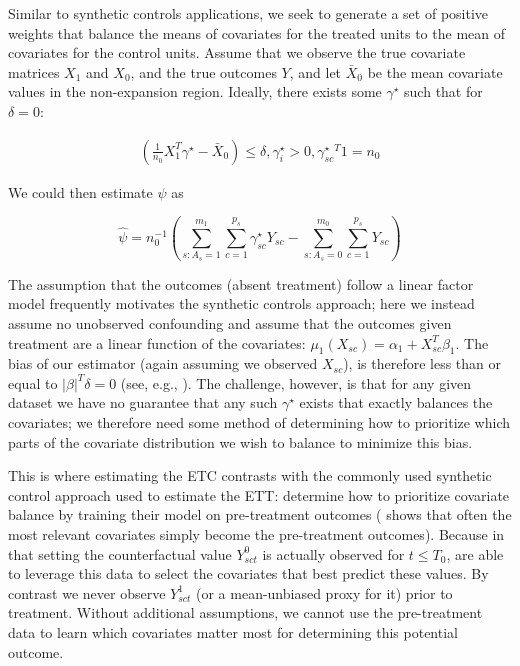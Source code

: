 \documentclass[aoas]{imsart}
\theoremstyle{plain}
\theoremstyle{remark}
\begin{document}
Similar to synthetic controls applications, we seek to generate a set of positive weights that balance the means of covariates for the treated units to the mean of covariates for the control units. Assume that we observe the true covariate matrices $X_1$ and $X_0$, and the true outcomes $Y$, and let $\bar{X}_0$ be the mean covariate values in the non-expansion region. Ideally, there exists some $\gamma^\star$ such that for $\delta = 0$: 

\begin{align*}
(\frac{1}{n_0}X_1^T\gamma^\star - \bar{X}_0) \le \delta, \gamma_i^\star > 0, \gamma_{sc}^\star^T1 = n_0
\end{align*}

We could then estimate $\psi$ as

\begin{equation}\label{eqn:psi}
\hat{\psi} = n_0^{-1}(\sum_{s: A_s = 1}^{m_1}\sum_{c = 1}^{p_s}\gamma_{sc}^\star Y_{sc} - \sum_{s: A_s = 0}^{m_0}\sum_{c = 1}^{p_s}Y_{sc})
\end{equation}

The assumption that the outcomes (absent treatment) follow a linear factor model frequently motivates the synthetic controls approach; here we instead assume no unobserved confounding and assume that the outcomes given treatment are a linear function of the covariates: $\mu_1(X_{sc}) = \alpha_1 + X_{sc}^T\beta_1$. The bias of our estimator (again assuming we observed $X_{sc}$), is therefore less than or equal to $\lvert\beta\rvert^T\delta = 0$ (see, e.g., \cite{zubizarreta2015stable}). The challenge, however, is that for any given dataset we have no guarantee that any such $\gamma^\star$ exists that exactly balances the covariates; we therefore need some method of determining how to prioritize which parts of the covariate distribution we wish to balance to minimize this bias.

This is where estimating the ETC contrasts with the commonly used synthetic control approach used to estimate the ETT: \cite{abadie2010synthetic} determine how to prioritize covariate balance by training their model on pre-treatment outcomes (\cite{kaul2015synthetic} shows that often the most relevant covariates simply become the pre-treatment outcomes). Because in that setting the counterfactual value $Y^0_{sct}$ is actually observed for $t \le T_0$, \cite{abadie2010synthetic} are able to leverage this data to select the covariates that best predict these values. By contrast we never observe $Y^1_{sct}$ (or a mean-unbiased proxy for it) prior to treatment. Without additional assumptions, we cannot use the pre-treatment data to learn which covariates matter most for determining this potential outcome.
\end{document}
